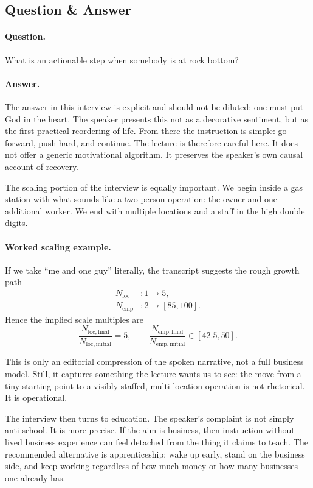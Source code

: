 \subsection{Question \& Answer}

\paragraph{Question.}
What is an actionable step when somebody is at rock bottom?

\paragraph{Answer.}
The answer in this interview is explicit and should not be diluted: one must put God in the heart. The speaker presents this not as a decorative sentiment, but as the first practical reordering of life. From there the instruction is simple: go forward, push hard, and continue. The lecture is therefore careful here. It does not offer a generic motivational algorithm. It preserves the speaker's own causal account of recovery.

The scaling portion of the interview is equally important. We begin inside a gas station with what sounds like a two-person operation: the owner and one additional worker. We end with multiple locations and a staff in the high double digits.

\paragraph{Worked scaling example.}
If we take ``me and one guy'' literally, the transcript suggests the rough growth path
\begin{align}
N_{\mathrm{loc}} &: 1 \to 5,\\
N_{\mathrm{emp}} &: 2 \to [85,100].
\end{align}
Hence the implied scale multiples are
\begin{equation}
\frac{N_{\mathrm{loc,final}}}{N_{\mathrm{loc,initial}}} = 5,
\qquad
\frac{N_{\mathrm{emp,final}}}{N_{\mathrm{emp,initial}}} \in [42.5,50].
\end{equation}

This is only an editorial compression of the spoken narrative, not a full business model. Still, it captures something the lecture wants us to see: the move from a tiny starting point to a visibly staffed, multi-location operation is not rhetorical. It is operational.

The interview then turns to education. The speaker's complaint is not simply anti-school. It is more precise. If the aim is business, then instruction without lived business experience can feel detached from the thing it claims to teach. The recommended alternative is apprenticeship: wake up early, stand on the business side, and keep working regardless of how much money or how many businesses one already has.

